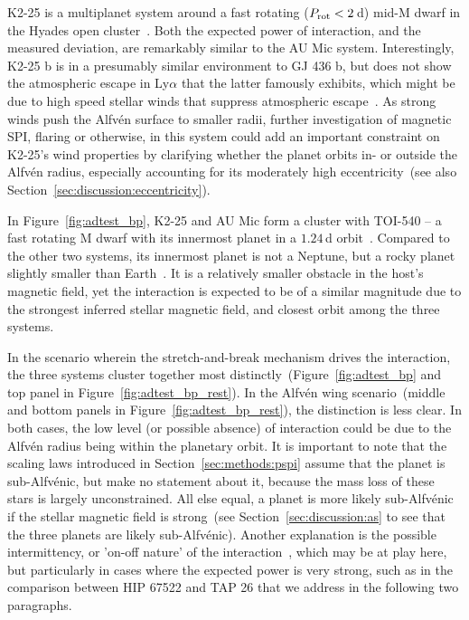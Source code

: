 \documentclass[twocolumn]{aastex631}
\begin{document}
K2-25 is a multiplanet system around a fast rotating ($P_{\rm rot}<2\,$d) mid-M dwarf in the Hyades open cluster~\citep[600-800 Myr, ][]{stefansson2020habitable}. Both the expected power of interaction, and the measured deviation, are remarkably similar to the AU Mic system. Interestingly, K2-25 b is in a presumably similar environment to GJ 436 b, but does not show the atmospheric escape in Ly$\alpha$ that the latter famously exhibits, which might be due to high speed stellar winds that suppress atmospheric escape~\citep{rockcliffe2021lya, carolan2020dichotomy, vidotto2020stellar}. As strong winds push the Alfv\'en surface to smaller radii, further investigation of magnetic SPI, flaring or otherwise, in this system could add an important constraint on K2-25's wind properties by clarifying whether the planet orbits in- or outside the Alfv\'en radius, especially accounting for its moderately high eccentricity~(see also Section~\ref{sec:discussion:eccentricity}).

In Figure~\ref{fig:adtest_bp}, K2-25 and AU Mic form a cluster with TOI-540 -- a fast rotating M dwarf with its innermost planet in a $1.24\,$d orbit~\citep{ment2021toi}. Compared to the other two systems, its innermost planet is not a Neptune, but a rocky planet slightly smaller than Earth~\citep{ment2021toi}. It is a relatively smaller obstacle in the host's magnetic field, yet the interaction is expected to be of a similar magnitude due to the strongest inferred stellar magnetic field, and closest orbit among the three systems. 

In the scenario wherein the stretch-and-break mechanism drives the interaction, the three systems cluster together most distinctly~(Figure~\ref{fig:adtest_bp} and top panel in Figure~\ref{fig:adtest_bp_rest}). In the Alfv\'en wing scenario~(middle and bottom panels in Figure~\ref{fig:adtest_bp_rest}), the distinction is less clear. In both cases, the low level (or possible absence) of interaction could be due to the Alfv\'en radius being within the planetary orbit. It is important to note that the scaling laws introduced in Section~\ref{sec:methods:pspi} assume that the planet is sub-Alfv\'enic, but make no statement about it, because the mass loss of these stars is largely unconstrained. All else equal, a planet is more likely sub-Alfv\'enic if the stellar magnetic field is strong~(see Section~\ref{sec:discussion:as} to see that the three planets are likely sub-Alfv\'enic). Another explanation is the possible intermittency, or 'on-off nature' of the interaction~\citep{shkolnik2008nature}, which may be at play here, but particularly in cases where the expected power is very strong, such as in the comparison between HIP 67522 and TAP 26 that we address in the following two paragraphs.
\end{document}
